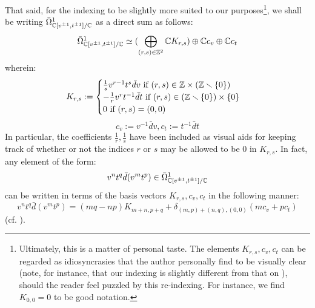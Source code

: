 \begin{example}
            That said, for the indexing to be slightly more suited to our purposes\footnote{Ultimately, this is a matter of personal taste. The elements $K_{r, s}, c_v, c_t$ can be regarded as idiosyncrasies that the author personally find to be visually clear (note, for instance, that our indexing is slightly different from that on \cite[p. 35]{wendlandt_formal_shift_operators_on_yangian_doubles}), should the reader feel puzzled by this re-indexing. For instance, we find $K_{0, 0} = 0$ to be good notation.}, we shall be writing $\bar{\Omega}^1_{\mathbb{C}[v^{\pm 1}, t^{\pm 1}]/\mathbb{C}}$ as a direct sum as follows:
                $$\bar{\Omega}^1_{\mathbb{C}[v^{\pm 1}, t^{\pm 1}]/\mathbb{C}} \simeq ( \bigoplus_{(r, s) \in \mathbb{Z}^2} \mathbb{C} K_{r, s}) \oplus \mathbb{C} c_v \oplus \mathbb{C} c_t$$
            wherein:
                $$
                    K_{r, s} :=
                    \begin{cases}
                        \text{$\frac1s v^{r - 1} t^s \bar{d}v$ if $(r, s) \in \Z \x (\Z \setminus \{0\})$}
                        \\
                        \text{$-\frac1r v^r t^{-1} \bar{d}t$ if $(r, s) \in (\Z \setminus \{0\}) \x \{0\}$}
                        \\
                        \text{$0$ if $(r, s) = (0, 0)$}
                    \end{cases}
                $$
                $$c_v := v^{-1} \bar{d}v, c_t := t^{-1} \bar{d}t$$
            In particular, the coefficients $\frac1r, \frac1s$ have been included as visual aids for keeping track of whether or not the indices $r$ or $s$ may be allowed to be $0$ in $K_{r, s}$. In fact, any element of the form:
                $$v^n t^q \bar{d}(v^m t^p) \in \bar{\Omega}^1_{\mathbb{C}[v^{\pm 1}, t^{\pm 1}]/\mathbb{C}}$$
            can be written in terms of the basis vectors $K_{r, s}, c_v, c_t$ in the following manner:
                $$v^n t^q \bar{d}(v^m t^p) = (mq - np) K_{m + n, p + q} + \delta_{(m, p) + (n, q), (0, 0)} ( m c_v + p c_t )$$
            (cf. \cite[p. 35]{wendlandt_formal_shift_operators_on_yangian_doubles}).


\end{example}
